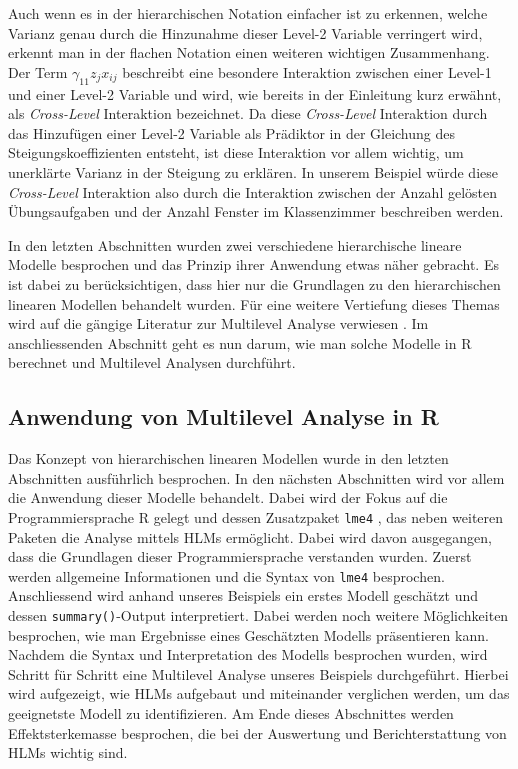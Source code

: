 \documentclass[12pt]{article}\usepackage[]{graphicx}\usepackage[]{color}
\begin{document}
Auch wenn es in der hierarchischen Notation einfacher ist zu erkennen, welche Varianz genau durch die Hinzunahme dieser Level-2 Variable verringert wird, erkennt man in der flachen Notation einen weiteren wichtigen Zusammenhang. Der Term $\gamma_{11}z_{j}x_{ij}$ beschreibt eine besondere Interaktion zwischen einer Level-1 und einer Level-2 Variable und wird, wie bereits in der Einleitung kurz erwähnt, als \textit{Cross-Level} Interaktion bezeichnet. Da diese \textit{Cross-Level} Interaktion durch das Hinzufügen einer Level-2 Variable als Prädiktor in der Gleichung des Steigungskoeffizienten entsteht, ist diese Interaktion vor allem wichtig, um unerklärte Varianz in der Steigung zu erklären. In unserem Beispiel würde diese \textit{Cross-Level} Interaktion also durch die Interaktion zwischen der Anzahl gelösten Übungsaufgaben und der Anzahl Fenster im Klassenzimmer beschreiben werden.

In den letzten Abschnitten wurden zwei verschiedene hierarchische lineare Modelle besprochen und das Prinzip ihrer Anwendung etwas näher gebracht. Es ist dabei zu berücksichtigen, dass hier nur die Grundlagen zu den hierarchischen linearen Modellen behandelt wurden. Für eine weitere Vertiefung dieses Themas wird auf die gängige Literatur zur Multilevel Analyse verwiesen \citep{andrew_data, raudenbush2002hierarchical, SnijdersTomA.B2012Ma:a, twisk_2006}. Im anschliessenden Abschnitt geht es nun darum, wie man solche Modelle in R berechnet und Multilevel Analysen durchführt.

\subsection{Anwendung von Multilevel Analyse in R} \label{section:ml_in_R}
Das Konzept von hierarchischen linearen Modellen wurde in den letzten Abschnitten ausführlich besprochen. In den nächsten Abschnitten wird vor allem die Anwendung dieser Modelle behandelt. Dabei wird der Fokus auf die Programmiersprache R gelegt und dessen Zusatzpaket \texttt{lme4} \citep{batesetal2015lme4}, das neben weiteren Paketen die Analyse mittels HLMs ermöglicht. Dabei wird davon ausgegangen, dass die Grundlagen dieser Programmiersprache verstanden wurden. Zuerst werden allgemeine Informationen und die Syntax von \texttt{lme4} besprochen. Anschliessend wird anhand unseres Beispiels ein erstes Modell geschätzt und dessen \texttt{summary()}-Output interpretiert. Dabei werden noch weitere Möglichkeiten besprochen, wie man Ergebnisse eines Geschätzten Modells präsentieren kann. Nachdem die Syntax und Interpretation des Modells besprochen wurden, wird Schritt für Schritt eine Multilevel Analyse unseres Beispiels durchgeführt. Hierbei wird aufgezeigt, wie HLMs aufgebaut und miteinander verglichen werden, um das geeignetste Modell zu identifizieren. Am Ende dieses Abschnittes werden Effektsterkemasse besprochen, die bei der Auswertung und Berichterstattung von HLMs wichtig sind.  
\end{document}

